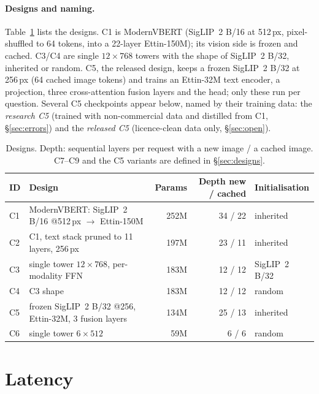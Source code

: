 \documentclass[10pt]{article}
\begin{document}
\paragraph{Designs and naming.} Table~\ref{tab:cands} lists the designs. C1 is ModernVBERT (SigLIP~2 B/16 at 512\,px, pixel-shuffled to 64 tokens, into a 22-layer Ettin-150M); its vision side is frozen and cached. C3/C4 are single $12\times768$ towers with the shape of SigLIP~2 B/32, inherited or random. C5, the released design, keeps a frozen SigLIP~2 B/32 at 256\,px (64 cached image tokens) and trains an Ettin-32M text encoder, a projection, three cross-attention fusion layers and the head; only these run per question. Several C5 checkpoints appear below, named by their training data: the \emph{research C5} (trained with non-commercial data and distilled from C1, \S\ref{sec:errors}) and the \emph{released C5} (licence-clean data only, \S\ref{sec:open}).

\begin{table}[t]
\centering\footnotesize
\caption{Designs. Depth: sequential layers per request with a new image / a cached image. C7--C9 and the C5 variants are defined in \S\ref{sec:designs}.}
\label{tab:cands}
\setlength\tabcolsep{4pt}
\begin{tabular}{llrrl}
\toprule
ID & Design & Params & Depth new / cached & Initialisation \\
\midrule
C1 & ModernVBERT: SigLIP~2 B/16 @512\,px $\to$ Ettin-150M & 252M & 34 / 22 & inherited \\
C2 & C1, text stack pruned to 11 layers, 256\,px & 197M & 23 / 11 & inherited \\
C3 & single tower $12\times768$, per-modality FFN & 183M & 12 / 12 & SigLIP~2 B/32 \\
C4 & C3 shape & 183M & 12 / 12 & random \\
C5 & frozen SigLIP~2 B/32 @256, Ettin-32M, 3 fusion layers & 134M & 25 / 13 & inherited \\
C6 & single tower $6\times512$ & 59M & 6 / 6 & random \\
\bottomrule
\end{tabular}
\end{table}

\section{Latency}\label{sec:latency}
\end{document}
